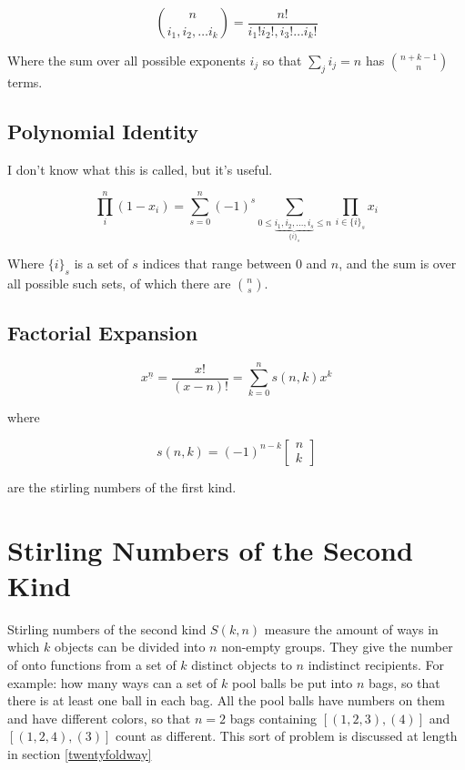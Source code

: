 \begin{equation}
{n \choose i_1,i_2,\hdots i_k} = \frac{n!}{i_1!i_2!,i_3!\hdots i_k!}
\end{equation}

Where the sum over all possible exponents $i_j$ so that $\sum_j i_j = n$ has ${n+k-1 \choose n}$ terms. 

\subsection{Polynomial Identity}
I don't know what this is called, but it's useful.

\begin{equation}
\prod_i^n (1-x_i) = \sum_{s=0}^{n} (-1)^s \sum_{0\leq \underbrace{i_1,i_2,...,i_s }_{\{i\}_s} \leq n} \prod_{i \in \{i\}_s} x_i
\end{equation}

Where $\{i\}_s$ is a set of $s$ indices that range between $0$ and $n$, and the sum is over all possible such sets, of which there are ${n \choose s}$.  

\subsection{Factorial Expansion}

\begin{equation}
x^{\underline{n}} = \frac{x!}{(x-n)!} = \sum_{k=0}^n s(n,k)x^k
\end{equation}

where

\begin{equation}
s(n,k) = (-1)^{n-k}\left[\begin{array}{c} n\\k \end{array}\right]
\end{equation}

are the stirling numbers of the first kind.

\section{Stirling Numbers of the Second Kind}
\label{sec:stirling2}

Stirling numbers of the second kind $S(k,n)$ measure the amount of ways in which $k$ objects can be divided into $n$ non-empty groups. They give the number of onto functions from a set of $k$ distinct objects to $n$ indistinct recipients. For example: how many ways can a set of $k$ pool balls be put into $n$ bags, so that there is at least one ball in each bag. All the pool balls have numbers on them and have different colors, so that $n=2$ bags containing $[(1,2,3), (4)] $ and $[(1,2,4),(3)]$ count as different. This sort of problem is discussed at length in section \ref{twentyfoldway}

